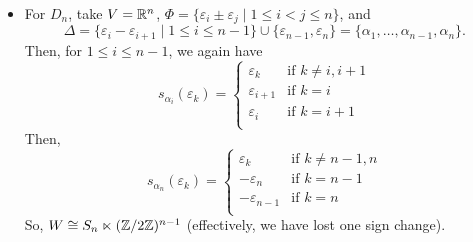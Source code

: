 \begin{itemize}
\item
For $D_n$, take $V = \mathbb{R}^n$, $\Phi = \{\varepsilon_i \pm \varepsilon_j \mid
1 \leq i < j \leq n\}$, and
\[
    \Delta = \{\varepsilon_i - \varepsilon_{i+1} \mid 1 \leq i \leq n-1\}
    \cup \{\varepsilon_{n-1}, \varepsilon_n\}
    = \{\alpha_1, \dots, \alpha_{n-1}, \alpha_n\}.
\]
Then, for $1 \leq i \leq n-1$, we again have
\[
    s_{\alpha_i}(\varepsilon_k) = \begin{cases}
        \varepsilon_k & \text{if } k \neq i, i+1 \\
        \varepsilon_{i+1} & \text{if } k = i \\
        \varepsilon_{i} & \text{if } k = i+1 \\
    \end{cases}
\]
Then,
\[
    s_{\alpha_n}(\varepsilon_k) = \begin{cases}
        \varepsilon_k & \text{if } k \neq n-1, n \\
        -\varepsilon_{n} & \text{if } k = n-1 \\
        -\varepsilon_{n-1} & \text{if } k = n \\
    \end{cases}
\]
So, $W \cong S_n \ltimes (\mathbb{Z}/2\mathbb{Z})^{n-1}$ (effectively, we have lost one sign
change).
\end{itemize}
